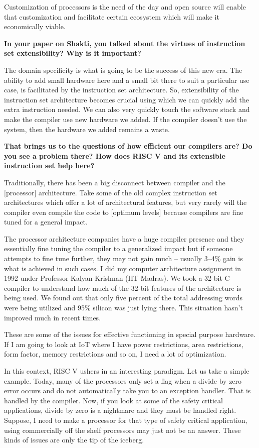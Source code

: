 \begin{multicols}{2}
Customization of processors is the need of the day and open source will enable that customization and facilitate certain ecosystem which will make it economically viable.
\vskip -0.1cm

{\bf In your paper on Shakti, you talked about the virtues of instruction set extensibility? Why is it important?}
\vskip -0.1cm

The domain specificity is what is going to be the success of this new era. The ability to add small hardware here and a small bit there to suit a particular use case, is facilitated by the instruction set architecture. So, extensibility of the instruction set architecture becomes crucial using which we can quickly add the extra instruction needed. We can also very quickly touch the software stack and make the compiler use new hardware we added. If the compiler doesn't use the system, then the hardware we added remains a waste.
\vskip -0.1cm

{\bf That brings us to the questions of how efficient our compilers are? Do you see a problem there? How does RISC V and its extensible instruction set help here?}
\vskip -0.1cm

Traditionally, there has been a big disconnect between compiler and the [processor] architecture. Take some of the old complex instruction set architectures which offer a lot of architectural features, but very rarely will the compiler even compile the code to [optimum levels] because compilers are fine tuned for a general impact.

The processor architecture companies have a huge compiler presence and they essentially fine tuning the compiler to a generalized impact but if someone attempts to fine tune further, they may not gain much -- usually 3--4\% gain is what is achieved in such cases. I did my computer architecture assignment in 1992 under Professor Kalyan Krishnan (IIT Madras). We took a 32-bit C compiler to understand how much of the 32-bit features of the architecture is being used. We found out that only five percent of the total addressing words were being utilized and 95\% silicon was just lying there. This situation hasn't improved much in recent times.

These are some of the issues for effective functioning in special purpose hardware. If I am going to look at IoT where I have power restrictions, area restrictions, form factor, memory restrictions and so on, I need a lot of optimization.

In this context, RISC V ushers in an interesting paradigm. Let us take a simple example.  Today, many of the processors only set a flag when a divide by zero error occurs and do not automatically take you to an exception handler. That is handled by the compiler. Now, if you look at some of the safety critical applications, divide by zero is a nightmare and they must be handled right. Suppose, I need to make a processor for that type of safety critical application, using commercially off the shelf processors may just not be an answer. These kinds of issues are only the tip of the iceberg.


\end{multicols}
